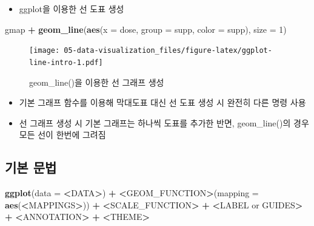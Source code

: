 \documentclass[
  11pt,
]{krantz}
\makeatletter
\newenvironment{Shaded}{\begin{snugshade}}{\end{snugshade}}
\newcommand{\DataTypeTok}[1]{\textcolor[rgb]{0.27,0.27,0.27}{#1}}
\newcommand{\DecValTok}[1]{\textcolor[rgb]{0.06,0.06,0.06}{#1}}
\newcommand{\ErrorTok}[1]{\textcolor[rgb]{0.14,0.14,0.14}{\textbf{#1}}}
\newcommand{\KeywordTok}[1]{\textcolor[rgb]{0.27,0.27,0.27}{\textbf{#1}}}
\newcommand{\NormalTok}[1]{#1}
\newcommand{\OperatorTok}[1]{\textcolor[rgb]{0.43,0.43,0.43}{\textbf{#1}}}
\newcommand{\StringTok}[1]{\textcolor[rgb]{0.5,0.5,0.5}{#1}}
\providecommand{\tightlist}{%
  \setlength{\itemsep}{0pt}\setlength{\parskip}{0pt}}
\newenvironment{kframe}{%
\medskip{}
\setlength{\fboxsep}{.8em}
 \def\at@end@of@kframe{}%
 \ifinner\ifhmode%
  \def\at@end@of@kframe{\end{minipage}}%
  \begin{minipage}{\columnwidth}%
 \fi\fi%
 \def\FrameCommand##1{\hskip\@totalleftmargin \hskip-\fboxsep
 \colorbox{shadecolor}{##1}\hskip-\fboxsep
     \hskip-\linewidth \hskip-\@totalleftmargin \hskip\columnwidth}%
 \MakeFramed {\advance\hsize-\width
   \@totalleftmargin\z@ \linewidth\hsize
   \@setminipage}}%
 {\par\unskip\endMakeFramed%
 \at@end@of@kframe}
\renewenvironment{quote}{\begin{kframe}}{\end{kframe}}
\makeatother
\begin{document}
\normalsize

\begin{itemize}
\tightlist
\item
  ggplot을 이용한 선 도표 생성
\end{itemize}

\footnotesize

\begin{Shaded}
\begin{Highlighting}[]
\NormalTok{gmap }\OperatorTok{+}\StringTok{ }
\StringTok{  }\KeywordTok{geom_line}\NormalTok{(}\KeywordTok{aes}\NormalTok{(}\DataTypeTok{x =}\NormalTok{ dose, }
                \DataTypeTok{group =}\NormalTok{ supp, }
                \DataTypeTok{color =}\NormalTok{ supp), }
            \DataTypeTok{size =} \DecValTok{1}\NormalTok{)}
\end{Highlighting}
\end{Shaded}

\begin{figure}
\centering
\texttt{[image: 05-data-visualization\_files/figure-latex/ggplot-line-intro-1.pdf]}
\caption{\label{fig:ggplot-line-intro}geom\_line()을 이용한 선 그래프 생성}
\end{figure}

\normalsize

\begin{quote}
\begin{itemize}
\tightlist
\item
  기본 그래프 함수를 이용해 막대도표 대신 선 도표 생성 시 완전히 다른 명령 사용
\item
  선 그래프 생성 시 기본 그래프는 하나씩 도표를 추가한 반면, geom\_line()의 경우 모든 선이 한번에 그려짐
\end{itemize}
\end{quote}

\hypertarget{basic-grammar}{%
\subsection{기본 문법}\label{basic-grammar}}

\footnotesize

\begin{Shaded}
\begin{Highlighting}[]
\KeywordTok{ggplot}\NormalTok{(}\DataTypeTok{data =} \OperatorTok{<}\NormalTok{DATA}\OperatorTok{>}\NormalTok{) }\OperatorTok{+}\StringTok{ }
\StringTok{  }\ErrorTok{<}\NormalTok{GEOM_FUNCTION}\OperatorTok{>}\NormalTok{(}\DataTypeTok{mapping =} \KeywordTok{aes}\NormalTok{(}\OperatorTok{<}\NormalTok{MAPPINGS}\OperatorTok{>}\NormalTok{)) }\OperatorTok{+}\StringTok{ }
\StringTok{  }\ErrorTok{<}\NormalTok{SCALE_FUNCTION}\OperatorTok{>}\StringTok{ }\OperatorTok{+}\StringTok{ }
\StringTok{  }\ErrorTok{<}\NormalTok{LABEL or GUIDES}\OperatorTok{>}\StringTok{ }\OperatorTok{+}\StringTok{ }
\StringTok{  }\ErrorTok{<}\NormalTok{ANNOTATION}\OperatorTok{>}\StringTok{ }\OperatorTok{+}\StringTok{ }
\StringTok{  }\ErrorTok{<}\NormalTok{THEME}\OperatorTok{>}
\end{Highlighting}
\end{Shaded}
\end{document}
